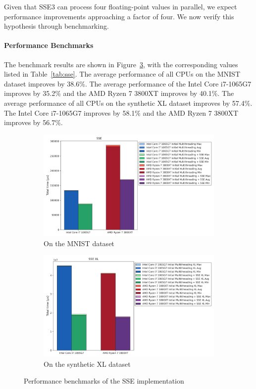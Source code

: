 \documentclass[modern,longauthor]{aastex7}
\begin{document}
Given that SSE3 can process four floating-point values in parallel, we expect performance improvements approaching a factor of four. We now verify this hypothesis through benchmarking.
\paragraph{Performance Benchmarks}
The benchmark results are shown in Figure~\ref{fig:sse}, with the corresponding values listed in Table~\ref{tab:sse}. The average performance of all CPUs on the MNIST dataset improves by 38.6\%. The average performance of the Intel Core i7-1065G7 improves by 35.2\% and the AMD Ryzen 7 3800XT improves by 40.1\%. The average performance of all CPUs on the synthetic XL dataset improves by 57.4\%. The Intel Core i7-1065G7 improves by 58.1\% and the AMD Ryzen 7 3800XT improves by 56.7\%.
\begin{figure}[htb!]
\centering
\begin{subfigure}{.5\textwidth}
  \centering
  \includegraphics[width=\linewidth]{Graphs/SSE.png}
  \caption{On the MNIST dataset}
 \label{fig:sse_mnist}
\end{subfigure}%
\begin{subfigure}{.5\textwidth}
  \centering
  \includegraphics[width=\linewidth]{Graphs/SSE XL.png}
  \caption{On the synthetic XL dataset}
 \label{fig:sse_xl}
\end{subfigure}
\caption{Performance benchmarks of the SSE implementation}
\label{fig:sse}
\end{figure}
\end{document}
